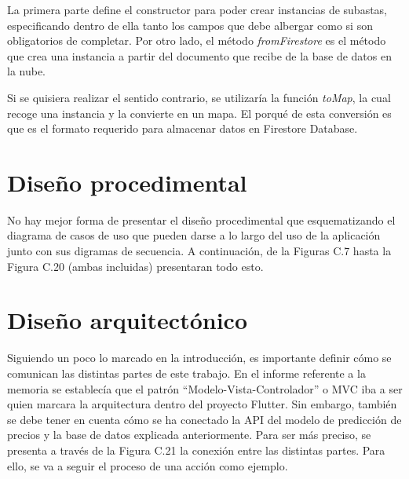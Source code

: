 
	La primera parte define el constructor para poder crear instancias de subastas, especificando dentro de ella tanto los campos que debe albergar como si son obligatorios de completar. Por otro lado, el método \emph{fromFirestore} es el método que crea una instancia a partir del documento que recibe de la base de datos en la nube.
	
	Si se quisiera realizar el sentido contrario, se utilizaría la función \emph{toMap}, la cual recoge una instancia y la convierte en un mapa. El porqué de esta conversión es que es el formato requerido para almacenar datos en Firestore Database.
	

\section{Diseño procedimental}

	No hay mejor forma de presentar el diseño procedimental que esquematizando el diagrama de casos de uso que pueden darse a lo largo del uso de la aplicación junto con sus digramas de secuencia. A continuación, de la Figuras C.7 hasta la Figura C.20 (ambas incluidas) presentaran todo esto.
	


\section{Diseño arquitectónico}

	Siguiendo un poco lo marcado en la introducción, es importante definir cómo se comunican las distintas partes de este trabajo. En el informe referente a la memoria se establecía que el patrón ``Modelo-Vista-Controlador'' o MVC iba a ser quien marcara la arquitectura dentro del proyecto Flutter. Sin embargo, también se debe tener en cuenta cómo se ha conectado la API del modelo de predicción de precios y la base de datos explicada anteriormente.
	Para ser más preciso, se presenta a través de la Figura C.21 la conexión entre las distintas partes. Para ello, se va a seguir el proceso de una acción como ejemplo.

